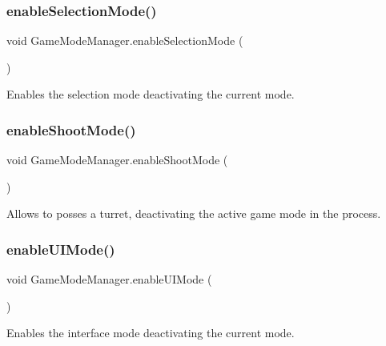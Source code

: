 \subsubsection{\texorpdfstring{enable\+Selection\+Mode()}{enableSelectionMode()}}
{\footnotesize\ttfamily void Game\+Mode\+Manager.\+enable\+Selection\+Mode (\begin{DoxyParamCaption}{ }\end{DoxyParamCaption})}



Enables the selection mode deactivating the current mode. 

\mbox{\label{class_game_mode_manager_a48288aeaccf2585ec6c8007c1b59c825}} 
\subsubsection{\texorpdfstring{enable\+Shoot\+Mode()}{enableShootMode()}}
{\footnotesize\ttfamily void Game\+Mode\+Manager.\+enable\+Shoot\+Mode (\begin{DoxyParamCaption}{ }\end{DoxyParamCaption})}



Allows to posses a turret, deactivating the active game mode in the process. 

\mbox{\label{class_game_mode_manager_a266f436dd6216a6a59bbb0bacdf247fe}} 
\subsubsection{\texorpdfstring{enable\+U\+I\+Mode()}{enableUIMode()}}
{\footnotesize\ttfamily void Game\+Mode\+Manager.\+enable\+U\+I\+Mode (\begin{DoxyParamCaption}{ }\end{DoxyParamCaption})}



Enables the interface mode deactivating the current mode. 

\mbox{\label{class_game_mode_manager_a11cd556a3f6c2a97136de40bbf62633c}} 

